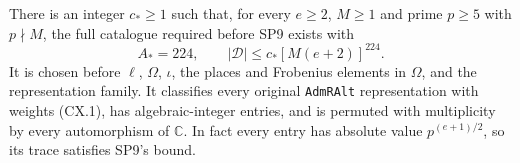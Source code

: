 \begin{proposition}
\label{claim:CX8}
There is an integer $c_*\ge1$ such that, for every $e\ge2$,
$M\ge1$ and prime $p\ge5$ with $p\nmid M$, the full
catalogue required before SP9 exists with
\[
                   A_*=224,
 \qquad |\mathcal D|\le c_*[M(e+2)]^{224}.                    \tag{CX.22}
\]
It is chosen before $\ell$, $\Omega$, $\iota$, the places
and Frobenius elements in $\Omega$, and the representation
family.  It classifies every original \texttt{AdmRAlt}
representation with weights (CX.1), has algebraic-integer
entries, and is permuted with multiplicity by every
automorphism of $\mathbb C$.  In fact every entry has
absolute value $p^{(e+1)/2}$, so its trace satisfies SP9's
bound.
\end{proposition}


